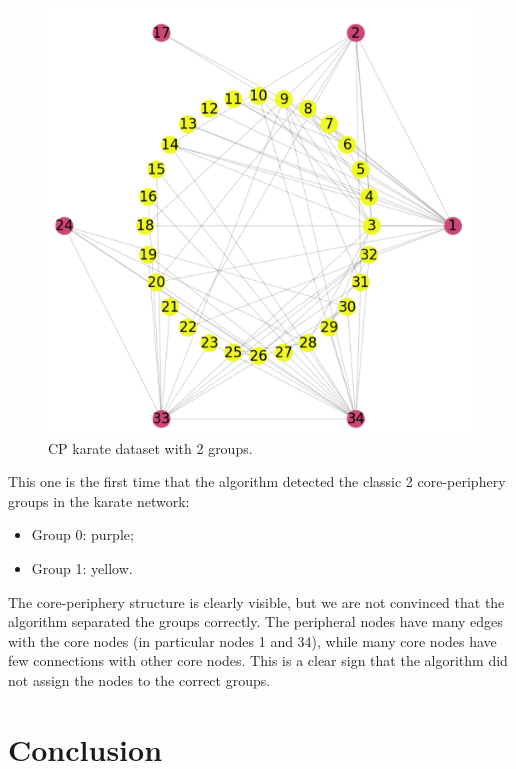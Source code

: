 \documentclass[sigconf]{acmart}
\begin{document}
\FloatBarrier
\begin{figure}[h]
    \centering
    \includegraphics[width=\linewidth]{Img/karate 2 groups.png}
    \caption{CP karate dataset with 2 groups.}
    \label{fig:general cp}
\end{figure}
\FloatBarrier
\noindent This one is the first time that the algorithm detected the classic 2 core-periphery groups in the karate network:
\begin{itemize}
    \item Group 0: purple;
    \item Group 1: yellow.
\end{itemize}
The core-periphery structure is clearly visible, but we are not convinced that the algorithm separated the groups correctly. The peripheral nodes have many edges with the core nodes (in particular nodes 1 and 34), while many core nodes have few connections with other core nodes. This is a clear sign that the algorithm did not assign the nodes to the correct groups.


\section{Conclusion}

\end{document}
